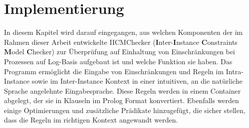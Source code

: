 
\chapter{Implementierung} %

\label{Chapter5} %



%
%
In diesem Kapitel wird darauf eingegangen, aus welchen Komponenten der im Rahmen dieser Arbeit entwickelte IICMChecker (\textbf{I}nter-\textbf{I}nstance \textbf{C}onstraints \textbf{M}odel \textbf{C}hecker) zur Überprüfung auf Einhaltung von Einschränkungen bei Prozessen auf Log-Basis aufgebaut ist und welche Funktion sie haben. Das Programm ermöglicht die Eingabe von Einschränkungen und Regeln im Intra-Instance sowie im Inter-Instance Kontext in einer intuitiven, an die natürliche Sprache angelehnte Eingabesprache. Diese Regeln werden in einem Container abgelegt, der sie in Klauseln im Prolog Format konvertiert. Ebenfalls werden einige Optimierungen und zusätzliche Prädikate hinzugefügt, die sicher stellen, dass die Regeln im richtigen Kontext angewandt werden.

